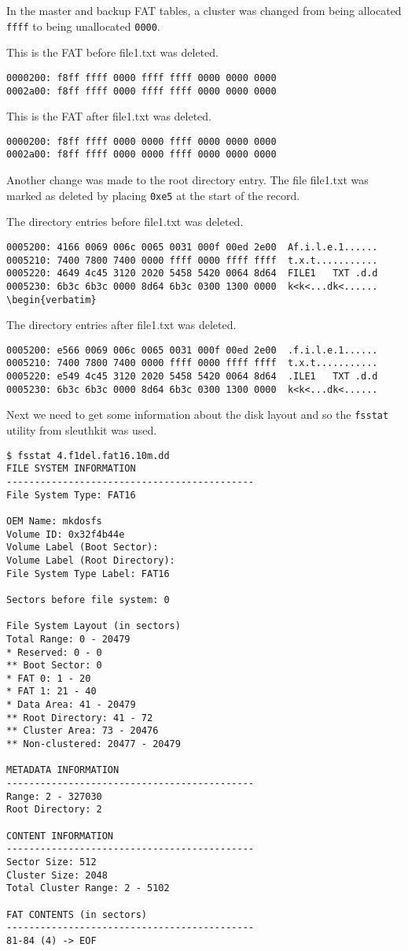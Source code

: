 \documentclass[a4paper,
    11pt,
    normalheadings,
    parindent,
    UKenglish,
    abstracton,
    ]{scrartcl}
\begin{document}
In the master and backup FAT tables, a cluster was changed from being allocated \texttt{ffff} to being unallocated \texttt{0000}.

This is the FAT before file1.txt was deleted.
\begin{verbatim}
0000200: f8ff ffff 0000 ffff ffff 0000 0000 0000 
0002a00: f8ff ffff 0000 ffff ffff 0000 0000 0000 
\end{verbatim}

This is the FAT after file1.txt was deleted.
\begin{verbatim}
0000200: f8ff ffff 0000 0000 ffff 0000 0000 0000
0002a00: f8ff ffff 0000 0000 ffff 0000 0000 0000 
\end{verbatim}

Another change was made to the root directory entry. The file file1.txt was marked as deleted by placing \texttt{0xe5} at the start of the record.

The directory entries before file1.txt was deleted.
\begin{verbatim}
0005200: 4166 0069 006c 0065 0031 000f 00ed 2e00  Af.i.l.e.1......
0005210: 7400 7800 7400 0000 ffff 0000 ffff ffff  t.x.t...........
0005220: 4649 4c45 3120 2020 5458 5420 0064 8d64  FILE1   TXT .d.d
0005230: 6b3c 6b3c 0000 8d64 6b3c 0300 1300 0000  k<k<...dk<......
\begin{verbatim}
\end{verbatim}

The directory entries after file1.txt was deleted.
\begin{verbatim}
0005200: e566 0069 006c 0065 0031 000f 00ed 2e00  .f.i.l.e.1......
0005210: 7400 7800 7400 0000 ffff 0000 ffff ffff  t.x.t...........
0005220: e549 4c45 3120 2020 5458 5420 0064 8d64  .ILE1   TXT .d.d
0005230: 6b3c 6b3c 0000 8d64 6b3c 0300 1300 0000  k<k<...dk<......
\end{verbatim}

Next we need to get some information about the disk layout and so the \texttt{fsstat} utility from sleuthkit was used.
\begin{verbatim}
$ fsstat 4.f1del.fat16.10m.dd 
FILE SYSTEM INFORMATION
--------------------------------------------
File System Type: FAT16

OEM Name: mkdosfs
Volume ID: 0x32f4b44e
Volume Label (Boot Sector):            
Volume Label (Root Directory):
File System Type Label: FAT16   

Sectors before file system: 0

File System Layout (in sectors)
Total Range: 0 - 20479
* Reserved: 0 - 0
** Boot Sector: 0
* FAT 0: 1 - 20
* FAT 1: 21 - 40
* Data Area: 41 - 20479
** Root Directory: 41 - 72
** Cluster Area: 73 - 20476
** Non-clustered: 20477 - 20479

METADATA INFORMATION
--------------------------------------------
Range: 2 - 327030
Root Directory: 2

CONTENT INFORMATION
--------------------------------------------
Sector Size: 512
Cluster Size: 2048
Total Cluster Range: 2 - 5102

FAT CONTENTS (in sectors)
--------------------------------------------
81-84 (4) -> EOF
\end{verbatim}
\end{document}
